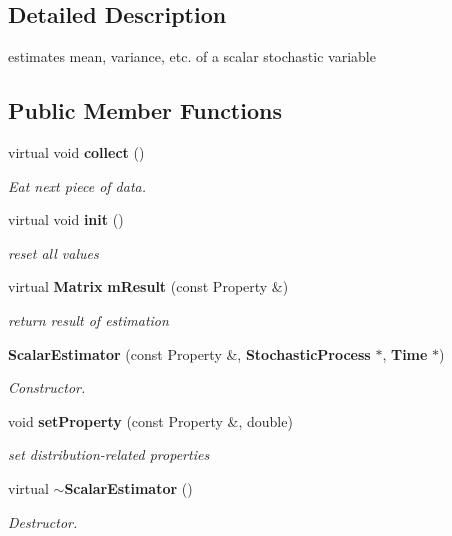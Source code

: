 \subsection{Detailed Description}
estimates mean, variance, etc. of a scalar stochastic variable \subsection*{Public Member Functions}
\begin{CompactItemize}
\item 
virtual void {\bf collect} ()\label{classScalarEstimator_fa275bacad14fae90cf403d42034112a}

\begin{CompactList}\small\item\em Eat next piece of data. \item\end{CompactList}\item 
virtual void {\bf init} ()\label{classScalarEstimator_8d86d47438a830cdf232565f69c178ae}

\begin{CompactList}\small\item\em reset all values \item\end{CompactList}\item 
virtual {\bf Matrix} {\bf mResult} (const Property \&)\label{classScalarEstimator_0b89bead8f660dc70a29f27c04a84211}

\begin{CompactList}\small\item\em return result of estimation \item\end{CompactList}\item 
{\bf ScalarEstimator} (const Property \&, {\bf StochasticProcess} $\ast$, {\bf Time} $\ast$)\label{classScalarEstimator_fe3a8e544172fa276c63404f9568e5a8}

\begin{CompactList}\small\item\em Constructor. \item\end{CompactList}\item 
void {\bf setProperty} (const Property \&, double)\label{classScalarEstimator_b6f834caacc81731a3ac8680f4ef133f}

\begin{CompactList}\small\item\em set distribution-related properties \item\end{CompactList}\item 
virtual {\bf $\sim$ScalarEstimator} ()\label{classScalarEstimator_47ce0d225e027640e8bc27488917cd59}

\begin{CompactList}\small\item\em Destructor. \item\end{CompactList}\end{CompactItemize}
